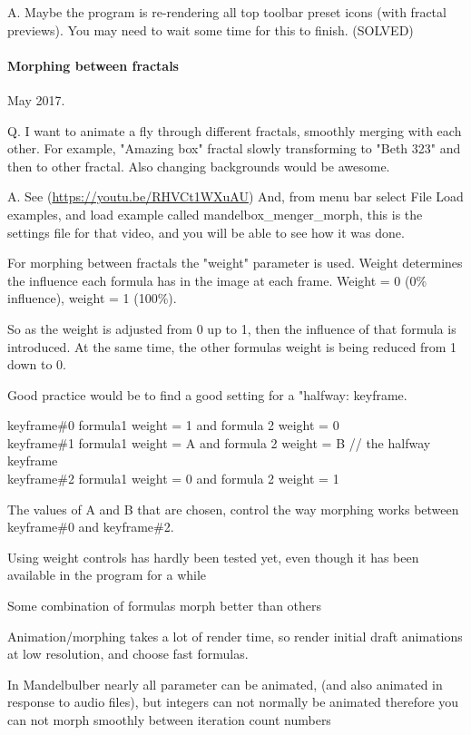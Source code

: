 A. Maybe the program is re-rendering  all top toolbar preset icons (with fractal previews). You may need to  wait some time for this to finish. (SOLVED)

\paragraph{Morphing between fractals} May 2017.

Q. I want to animate a fly through different fractals, smoothly merging with each other. For example, "Amazing box" fractal slowly transforming to "Beth 323" and then to other fractal. Also changing backgrounds would be awesome.

A.  See (\href{https://youtu.be/RHVCt1WXuAU}{https://youtu.be/RHVCt1WXuAU})  And, from menu bar select    File \- Load examples, and load example called  mandelbox\_menger\_morph, this is the settings file for that video, and you will be able to see how it was done.

For morphing between fractals  the "weight" parameter is used.  Weight determines the influence each formula has in the image at each frame.  Weight = 0 (0\% influence), weight = 1 (100\%).

So as  the weight is adjusted from 0 up to 1, then the influence of that formula is introduced. At the same time, the other formulas weight is being reduced from 1 down to 0.

Good practice would be to find a good setting for a "halfway: keyframe.

keyframe\#0   formula1 weight = 1 and formula 2 weight = 0\\
keyframe\#1   formula1 weight = A and formula 2 weight = B    // the halfway keyframe\\
keyframe\#2   formula1 weight = 0 and formula 2 weight = 1

The values of A and B that are chosen, control the way morphing works between keyframe\#0 and keyframe\#2.

Using weight controls has hardly been tested yet, even though it has been available in the program for a while

Some combination of formulas morph better than others

Animation/morphing takes a lot of render time, so render initial draft animations at low resolution, and choose fast formulas.

In Mandelbulber nearly all parameter can be animated, (and also animated in response to audio files), but integers can not normally be animated therefore you can not morph smoothly between iteration count numbers


